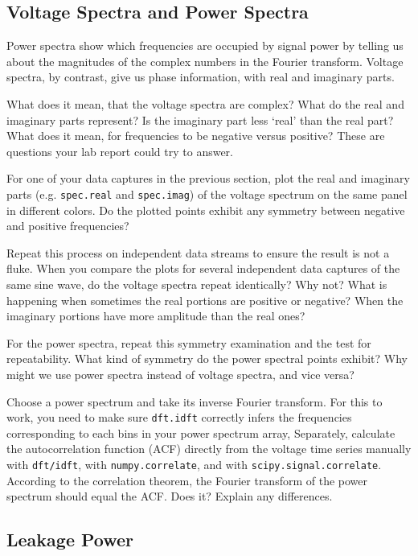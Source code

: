 \documentclass[12pt,preprint]{aastex}
\begin{document}
\subsection{Voltage Spectra and Power Spectra}

\noindent
Power spectra show which frequencies are occupied by signal power by telling
us about the magnitudes of the complex numbers in the Fourier transform.  Voltage
spectra, by contrast, give us phase information,
with real and imaginary parts.

What does it mean, that the voltage spectra are complex? What do the real
and imaginary parts represent? Is the imaginary part less `real'
than the real part?
What does it mean, for frequencies to be negative versus
positive? These are questions your lab report could try to answer.

For one of your data captures in the previous section, plot the real and imaginary parts
(e.g. {\tt spec.real} and {\tt spec.imag})
of the voltage spectrum on the same panel in different colors.
Do the plotted points 
exhibit any symmetry between negative and positive
frequencies?

Repeat this process on independent data
streams to ensure the result is not a fluke.
When you compare the plots for several independent data captures of the same sine wave, do the
voltage spectra repeat identically?  Why not? What is happening when
sometimes the real portions are positive or negative? When the imaginary
portions have more amplitude than the real ones?

For the power spectra, repeat this symmetry examination and the test for
repeatability. What kind of symmetry do the power spectral points
exhibit? Why might we use power spectra instead of voltage spectra, and vice versa?

Choose a power spectrum and take its inverse Fourier transform.
For this to work, you need to make sure {\tt dft.idft} correctly infers
the frequencies corresponding to each bins in your power spectrum array,
Separately, calculate the autocorrelation function (ACF) directly from 
the voltage time series manually with {\tt dft/idft}, with \verb$numpy.correlate$, and with \verb$scipy.signal.correlate$.
According to the correlation theorem, the Fourier transform
of the power spectrum should equal the ACF. Does it? Explain any differences.

\subsection{Leakage Power} \label{subleakage}
\end{document}
